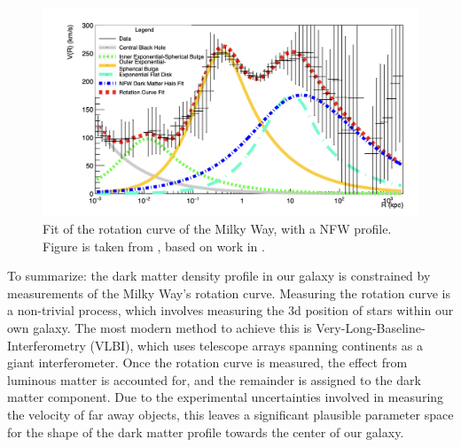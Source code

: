 \begin{figure}
    \centering
    \includegraphics[width=\textwidth]{figures/Felix_rot_curve_fit.png}
    \caption{Fit of the rotation curve of the Milky Way, with a NFW profile. Figure is taken from \cite{Felix thesis}, based on work in \cite{}.}
    \label{fig:RotationCurveFit}
\end{figure}
To summarize: the dark matter density profile in our galaxy is constrained by measurements of the Milky Way's rotation curve. Measuring the rotation curve is a non-trivial process, which involves measuring the 3d position of stars within our own galaxy. The most modern method to achieve this is Very-Long-Baseline-Interferometry (VLBI), which uses telescope arrays spanning continents as a giant interferometer. Once the rotation curve is measured, the effect from luminous matter is accounted for, and the remainder is assigned to the dark matter component. Due to the experimental uncertainties involved in measuring the velocity of far away objects, this leaves a significant plausible parameter space for the shape of the dark matter profile towards the center of our galaxy. \\

